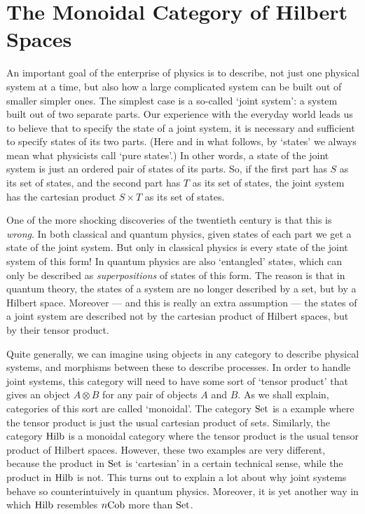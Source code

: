 \documentclass[12pt]{article}
\newcommand{\Set}{{\rm Set}}
\newcommand{\Hilb}{{\rm Hilb}}
\newcommand{\Cob}{{\rm Cob}}
\newcommand{\tensor}{\otimes}
\begin{document}
\section{The Monoidal Category of Hilbert Spaces} 
\label{monoidal}

An important goal of the enterprise of physics is to describe, not
just one physical system at a time, but also how a large complicated
system can be built out of smaller simpler ones.  The simplest case is
a so-called `joint system': a system built out of two separate parts.
Our experience with the everyday world leads us to believe that to
specify the state of a joint system, it is necessary and sufficient to
specify states of its two parts.  (Here and in what follows, by
`states' we always mean what physicists call `pure states'.)  In other
words, a state of the joint system is just an ordered pair of states
of its parts.  So, if the first part has $S$ as its set of states, and
the second part has $T$ as its set of states, the joint system has the
cartesian product $S \times T$ as its set of states.
  
One of the more shocking discoveries of the twentieth century is that
this is {\it wrong}.  In both classical and quantum physics, given
states of each part we get a state of the joint system.  But only in
classical physics is every state of the joint system of this form!  In
quantum physics are also `entangled' states, which can only be
described as {\it superpositions} of states of this form.  The reason
is that in quantum theory, the states of a system are no longer
described by a set, but by a Hilbert space.  Moreover --- and this is
really an extra assumption --- the states of a joint system are
described not by the cartesian product of Hilbert spaces, but by their
tensor product.

Quite generally, we can imagine using objects in any category to
describe physical systems, and morphisms between these to describe
processes.  In order to handle joint systems, this category will need
to have some sort of `tensor product' that gives an object $A \tensor
B$ for any pair of objects $A$ and $B$.  As we shall explain,
categories of this sort are called `monoidal'.  The category $\Set$ is
a example where the tensor product is just the usual cartesian product
of sets.  Similarly, the category $\Hilb$ is a monoidal category where
the tensor product is the usual tensor product of Hilbert spaces.
However, these two examples are very different, because the product in
$\Set$ is `cartesian' in a certain technical sense, while the product
in $\Hilb$ is not.  This turns out to explain a lot about why joint
systems behave so counterintuively in quantum physics.  Moreover, it
is yet another way in which $\Hilb$ resembles $n\Cob$ more than
$\Set$.
\end{document}
